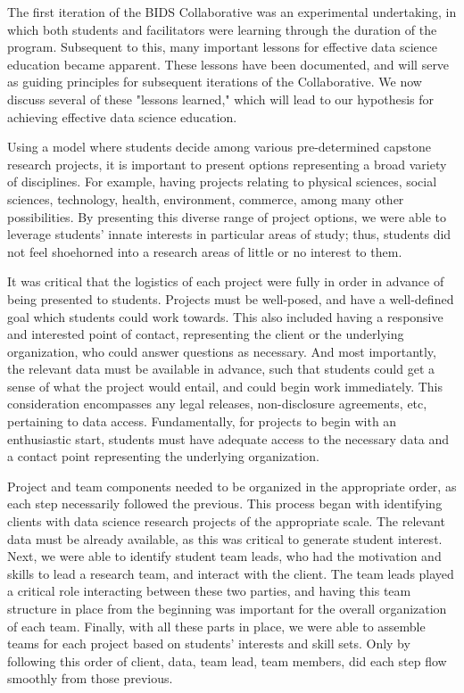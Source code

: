 \documentclass{sig-alternate}
\begin{document}
The first iteration of the BIDS Collaborative was an experimental undertaking, in which both students and facilitators were learning through the duration of the program.  Subsequent to this, many important lessons for effective data science education became apparent.  These lessons have been documented, and will serve as guiding principles for subsequent iterations of the Collaborative. We now discuss several of these "lessons learned," which will lead to our hypothesis for achieving effective data science education.

Using a model where students decide among various pre-determined capstone research projects, it is important to present options representing a broad variety of disciplines.  For example, having projects relating to physical sciences, social sciences, technology, health, environment, commerce, among many other possibilities.  By presenting this diverse range of project options, we were able to leverage students' innate interests in particular areas of study; thus, students did not feel shoehorned into a research areas of little or no interest to them.

It was critical that the logistics of each project were fully in order in advance of being presented to students.  Projects must be well-posed, and have a well-defined goal which students could work towards.  This also included having a responsive and interested point of contact, representing the client or the underlying organization, who could answer questions as necessary.  And most importantly, the relevant data must be available in advance, such that students could get a sense of what the project would entail, and could begin work immediately.  This consideration encompasses any legal releases, non-disclosure agreements, etc, pertaining to data access.  Fundamentally, for projects to begin with an enthusiastic start, students must have adequate access to the necessary data and a contact point representing the underlying organization.

Project and team components needed to be organized in the appropriate order, as each step necessarily followed the previous.  This process began with identifying clients with data science research projects of the appropriate scale.  The relevant data must be already available, as this was critical to generate student interest.  Next, we were able to identify student team leads, who had the motivation and skills to lead a research team, and interact with the client.  The team leads played a critical role interacting between these two parties, and having this team structure in place from the beginning was important for the overall organization of each team.  Finally, with all these parts in place, we were able to assemble teams for each project based on students' interests and skill sets.  Only by following this order of client, data, team lead, team members, did each step flow smoothly from those previous.
\end{document}
